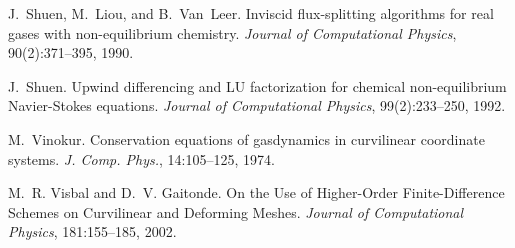 \begin{DoxyDescription}
\item[\label{_CITEREF_shuen1990inviscid}%
\mbox{[}9\mbox{]}]J.~Shuen, M.~Liou, and B.~Van~Leer. Inviscid flux-\/splitting algorithms for real gases with non-\/equilibrium chemistry. {\itshape Journal of Computational Physics}, 90(2)\+:371--395, 1990.


\item[\label{_CITEREF_shuen1992upwind}%
\mbox{[}10\mbox{]}]J.~Shuen. Upwind differencing and LU factorization for chemical non-\/equilibrium Navier-\/\+Stokes equations. {\itshape Journal of Computational Physics}, 99(2)\+:233--250, 1992.


\item[\label{_CITEREF_vinokur:1974}%
\mbox{[}11\mbox{]}]M.~Vinokur. Conservation equations of gasdynamics in curvilinear coordinate systems. {\itshape J. Comp. Phys.}, 14\+:105--125, 1974.


\item[\label{_CITEREF_visbal/gaitonde:2002}%
\mbox{[}12\mbox{]}]M.~R. Visbal and D.~V. Gaitonde. On the Use of Higher-\/\+Order Finite-\/\+Difference Schemes on Curvilinear and Deforming Meshes. {\itshape Journal of Computational Physics}, 181\+:155--185, 2002.


\end{DoxyDescription}